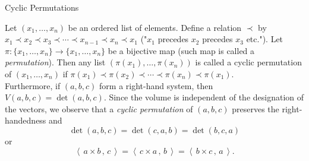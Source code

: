 \documentclass[smaller,hyperref={CJKbookmarks=true}]{beamer}
\newcommand{\scp}[2]{\left\langle\,#1\,,\,#2\,\right\rangle} \newcommand{\scpp}{\langle\,\cdot\,,\,\cdot\,\rangle}
\begin{document}
\begin{frame}[c]{Cyclic Permutations}
\begin{spacing}{1.05}
Let $(x_1,\ldots,x_n)$ be an ordered list of elements. Define a relation $\prec$ by $x_1\prec x_2\prec x_3\prec\cdots\prec x_{n-1}\prec x_n\prec x_1$ ("$x_1$ precedes $x_2$ precedes $x_3$ etc."). Let $\pi:\{x_1,\ldots,x_n\}\to\{x_1,\ldots,x_n\}$ be a bijective map (such map is called a \emph{permutation}). Then any list $\left(\pi(x_1),\ldots,\pi(x_n)\right)$ is called a cyclic permutation of $(x_1,\ldots,x_n)$ if $\pi(x_1)\prec\pi(x_2)\prec\cdots\prec\pi(x_n)\prec\pi(x_1)$.\\
Furthermore, if $(a,b,c)$ form a right-hand system, then $V(a,b,c)=\det(a,b,c)$. Since the volume is independent of the
designation of the vectors, we observe that a \emph{cyclic permutation} of $(a,b,c)$ preserves the right-handedness and
\[\det(a,b,c)=\det(c,a,b)=\det(b,c,a)\]
or
\[\scp{a\times b}{c}=\scp{c\times a}{b}=\scp{b\times c}{a}.\]
\end{spacing}
\end{frame}
\end{document}
